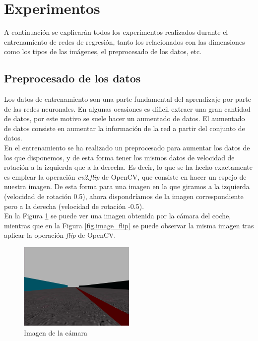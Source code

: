 \section{Experimentos}

A continuación se explicarán todos los experimentos realizados durante el entrenamiento de redes de regresión, tanto los relacionados con las dimensiones como los tipos de las imágenes, el preprocesado de los datos, etc. \\

\subsection{Preprocesado de los datos}

Los datos de entrenamiento son una parte fundamental del aprendizaje por parte de las redes neuronales. En algunas ocasiones es díficil extraer una gran cantidad de datos, por este motivo se suele hacer un aumentado de datos. El aumentado de datos consiste en aumentar la información de la red a partir del conjunto de datos.\\

En el entrenamiento se ha realizado un preprocesado para aumentar los datos de los que disponemos, y de esta forma tener los mismos datos de velocidad de rotación a la izquierda que a la derecha. Es decir, lo que se ha hecho exactamente es emplear la operación \textit{cv2.flip} de OpenCV, que consiste en hacer un espejo de nuestra imagen. De esta forma para una imagen en la que giramos a la izquierda (velocidad de rotación 0.5), ahora dispondríamos de la imagen correspondiente pero a la derecha (velocidad de rotación -0.5).\\

En la Figura \ref{fig.image_camera} se puede ver una imagen obtenida por la cámara del coche, mientras que en la Figura \ref{fig.image_flip} se puede observar la misma imagen tras aplicar la operación \textit{flip} de OpenCV.\\


\begin{figure}
\begin{center}
	\includegraphics[width=0.5\textwidth]{figures/Regresion/img_normal.png}
   \caption{Imagen de la cámara}
	\label{fig.image_camera}
\end{center}
\end{figure}

